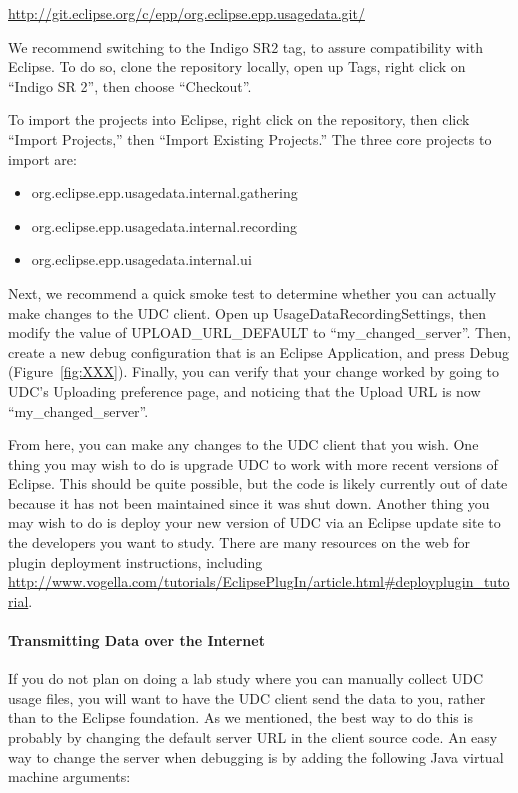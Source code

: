 \noindent
\url{http://git.eclipse.org/c/epp/org.eclipse.epp.usagedata.git/}

We recommend switching to the Indigo SR2 tag, to assure compatibility with
Eclipse.
To do so, clone the repository locally, open up Tags, right click on ``Indigo SR 2'',
then choose ``Checkout''.

To import the projects into Eclipse, right click on the repository, then click 
``Import Projects,'' then ``Import Existing Projects.''
The three core projects to import are:

\begin{itemize}
\item org.eclipse.epp.usagedata.internal.gathering
\item org.eclipse.epp.usagedata.internal.recording
\item org.eclipse.epp.usagedata.internal.ui
\end{itemize}

Next, we recommend a quick smoke test to determine whether you 
can actually make changes to the UDC client.
Open up UsageDataRecordingSettings, then modify the value of UPLOAD\_URL\_DEFAULT
to ``my\_changed\_server''.
Then, create a new debug configuration that is an Eclipse Application, and press 
Debug (Figure~\ref{fig:XXX}).
Finally, you can verify that your change worked by going to UDC's Uploading 
preference page, and noticing that the Upload URL is now ``my\_changed\_server''.

From here, you can make any changes to the UDC client that you wish.
One thing you may wish to do is upgrade UDC to work with more recent versions
of Eclipse.
This should be quite possible, but the code is likely currently out of date
because it has not been maintained since it was shut down.
Another thing you may wish to do is deploy your new version of UDC via
an Eclipse update site to the developers you want to study.
There are many resources on the web for plugin deployment instructions,
including \url{http://www.vogella.com/tutorials/EclipsePlugIn/article.html#deployplugin_tutorial}.

\paragraph{Transmitting Data over the Internet}

If you do not plan on doing a lab study where you can manually collect UDC usage
files, you will want to have the UDC client send the data to you,
rather than to the Eclipse foundation.
As we mentioned, the best way to do this is probably by changing the default
server URL in the client source code.
An easy way to change the server when debugging is by adding the following Java
virtual machine arguments:

